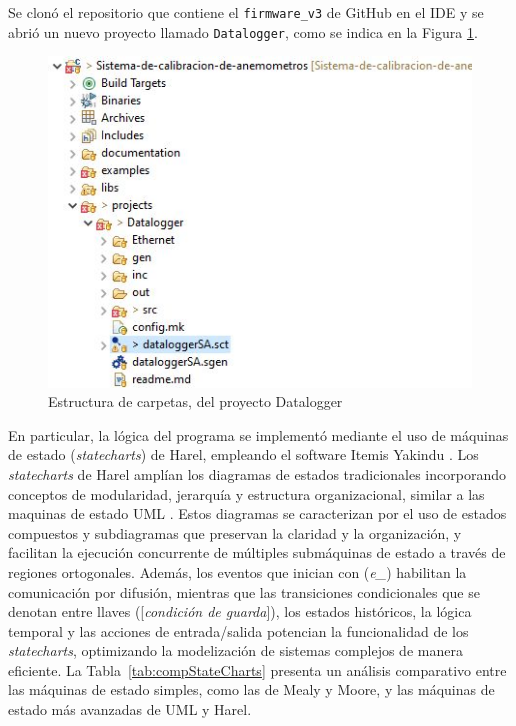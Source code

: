 Se clonó el repositorio que contiene el \texttt{firmware\_v3} de GitHub en el IDE y se abrió un nuevo proyecto llamado \texttt{Datalogger}, como se indica en la Figura \ref{fig:projectDataloggerFolder}.

\begin{figure}[H]
    \centering
    \includegraphics[width=0.40\linewidth]{Figuras/datalogger/Firmware/projectDataloggerFolder.jpg}
    \caption{Estructura de carpetas, del proyecto Datalogger}
    \label{fig:projectDataloggerFolder}
\end{figure}
En particular, la lógica del programa se implementó mediante el uso de máquinas de estado (\textit{statecharts}) de Harel, empleando el software Itemis Yakindu \cite{itemis_create}. Los \textit{statecharts} de Harel amplían los diagramas de estados tradicionales incorporando conceptos de modularidad, jerarquía y estructura organizacional, similar a las maquinas de estado UML \cite{uml_state_machine}. Estos diagramas se caracterizan por el uso de estados compuestos y subdiagramas que preservan la claridad y la organización, y facilitan la ejecución concurrente de múltiples submáquinas de estado a través de regiones ortogonales. Además, los eventos que inician con (\textit{e\_}) habilitan la comunicación por difusión, mientras que las transiciones condicionales que se denotan entre llaves ([\textit{condición de guarda}]), los estados históricos, la lógica temporal y las acciones de entrada/salida potencian la funcionalidad de los \textit{statecharts}, optimizando la modelización de sistemas complejos de manera eficiente. La Tabla~\ref{tab:compStateCharts} presenta un análisis comparativo entre las máquinas de estado simples, como las de Mealy y Moore, y las máquinas de estado más avanzadas de UML y Harel.


